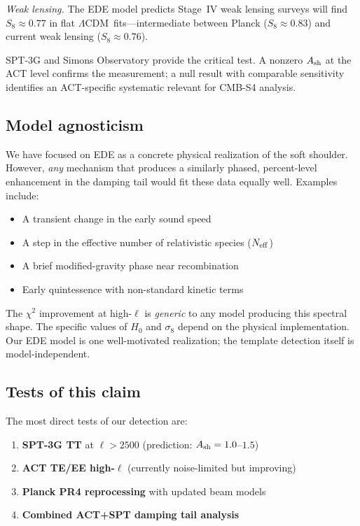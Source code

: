 \documentclass[twocolumn,showpacs,preprintnumbers,amsmath,amssymb,prd]{revtex4-2}
\newcommand{\lcdm}{$\Lambda$CDM}
\begin{document}
\emph{Weak lensing.} The EDE model predicts Stage~IV weak lensing surveys 
will find $S_8 \approx 0.77$ in flat \lcdm\ fits---intermediate between 
Planck ($S_8 \approx 0.83$) and current weak lensing ($S_8 \approx 0.76$).

SPT-3G and Simons Observatory provide the critical test. A nonzero $A_{\rm sh}$ 
at the ACT level confirms the measurement; a null result with comparable 
sensitivity identifies an ACT-specific systematic relevant for CMB-S4 analysis.

\subsection{Model agnosticism}
\label{sec:agnostic}

We have focused on EDE as a concrete physical realization of the soft 
shoulder. However, \emph{any} mechanism that produces a similarly phased, 
percent-level enhancement in the damping tail would fit these data 
equally well. Examples include:
\begin{itemize}
\item A transient change in the early sound speed
\item A step in the effective number of relativistic species ($N_{\rm eff}$)
\item A brief modified-gravity phase near recombination
\item Early quintessence with non-standard kinetic terms
\end{itemize}

The $\chi^2$ improvement at high-$\ell$ is \emph{generic} to any model 
producing this spectral shape. The specific values of $H_0$ and $\sigma_8$ 
depend on the physical implementation. Our EDE model is one well-motivated 
realization; the template detection itself is model-independent.

\subsection{Tests of this claim}
\label{sec:tests}

The most direct tests of our detection are:
\begin{enumerate}
\item \textbf{SPT-3G TT} at $\ell > 2500$ (prediction: $A_{\rm sh} = 1.0$--$1.5$)
\item \textbf{ACT TE/EE high-$\ell$} (currently noise-limited but improving)
\item \textbf{Planck PR4 reprocessing} with updated beam models
\item \textbf{Combined ACT+SPT damping tail analysis}
\end{enumerate}
\end{document}
